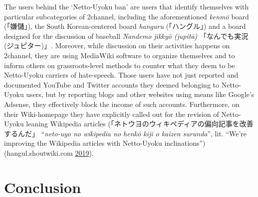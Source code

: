 \documentclass[10pt,british,A4paper,oneside]{memoir}
\begin{document}
The users behind the `Netto-Uyoku ban' are users that identify
themselves with particular subcategories of 2channel, including the
aforementioned \emph{kenmō} board (「嫌儲」), the South Korean-centered
board \emph{hanguru} (「ハングル」) and a board designed for the
discussion of baseball \emph{Nandemo jikkyō (jupitā)} 「なんでも実況
(ジュピター)」. Moreover, while discussion on their activities happens
on 2channel, they are using MediaWiki software to organize
themselves and to inform others on grassroots-level methods to counter what they
deem to be Netto-Uyoku carriers of hate-speech. Those users have not
just reported and documented YouTube and Twitter accounts they deemed
belonging to Netto-Uyoku users, but by reporting blogs and other
websites using means like Google's Adsense, they effectively block the
income of such accounts. Furthermore, on their Wiki-homepage they have
explicitly called out for the revision of Netto-Uyoku leaning Wikipedia
articles (「ネトウヨのウィキペディアの偏向記事を改善するんだ」
``\emph{neto-uyo no wikipedia no henkō kiji o kaizen surunda}'', lit.
``We're improving the Wikipedia articles with Netto-Uyoku
inclinations'') (hangul.shoutwiki.com
\protect\hyperlink{ref-hangul.shoutwiki.com_wikipedia_2019}{2019}).

\section{Conclusion}\label{conclusion-2}
\end{document}
